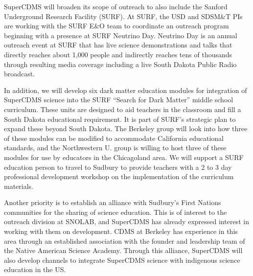SuperCDMS will broaden its scope of outreach to also include the Sanford Underground Research Facility (SURF). At SURF, the USD and SDSM\&T PIs are working with the SURF E\&O team to coordinate an outreach program beginning with a presence at SURF Neutrino Day. Neutrino Day is an annual outreach event at SURF that has live science demonstrations and talks that directly reaches about 1,000 people and indirectly reaches tens of thousands through resulting media coverage including a live South Dakota Public Radio broadcast.

In addition, we will develop six dark matter education modules for integration of SuperCDMS science into the SURF “Search for Dark Matter” middle school curriculum. These units are designed to aid teachers in the classroom and fill a South Dakota educational requirement. It is part of SURF’s strategic plan to expand these beyond South Dakota. The Berkeley group will look into how three of these modules can be modified to accommodate California educational standards, and the Northwestern U. group is willing to host three of these modules for use by educators in the Chicagoland area. We will support a SURF education person to travel to Sudbury to provide teachers with a 2 to 3 day professional development workshop on the implementation of the curriculum materials. 

Another priority is to establish an alliance with Sudbury's First Nations communities for the sharing of science education. This is of interest to the outreach division at SNOLAB, and SuperCDMS has already expressed interest in working with them on development. CDMS at Berkeley has experience in this area through an established association with the founder and leadership team of the Native American Science Academy. Through this alliance, SuperCDMS will also develop channels to integrate SuperCDMS science with indigenous science education in the US.

